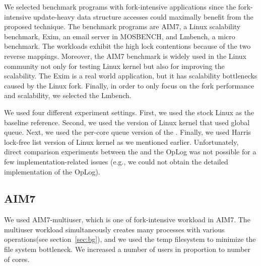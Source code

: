 We selected benchmark programs with fork-intensive applications since the fork-intensive update-heavy data structure accesses could maximally benefit from the proposed technique.
The benchmark programs are AIM7, a Linux
scalability benchmark, Exim, an email server in MOSBENCH, and Lmbench, a micro benchmark.
The workloads exhibit the high lock contentions because of the two reverse mappings.
Moreover, the AIM7 benchmark is widely used in the Linux community not only for
testing Linux kernel but also for improving the scalability. 
The Exim is a real world application, but it has scalability bottlenecks caused
by the Linux fork.
Finally, in order to only focus on the fork performance and scalability, we
selected the Lmbench.

We used four different experiment settings. 
First, we used the stock Linux as the baseline reference. 
Second, we used the \LDU version of Linux kernel that used global queue.
Next, we used the per-core queue version of the \LDU.
Finally, we used Harris lock-free list version of Linux kernel as we
mentioned earlier.
Unfortunately, direct comparison experiments between the \LDU and the OpLog was not possible for a few implementation-related issues
(e.g., we could not obtain the detailed implementation of the OpLog).

\subsection{AIM7}



We used AIM7-multiuser, which is one of fork-intensive workload in AIM7.
The multiuser workload simultaneously creates many processes with various
operations(see section~\ref{sec:bg}), and we used the temp filesystem to minimize the file
system bottleneck.
We increased a number of users in proportion to number of cores.
 
